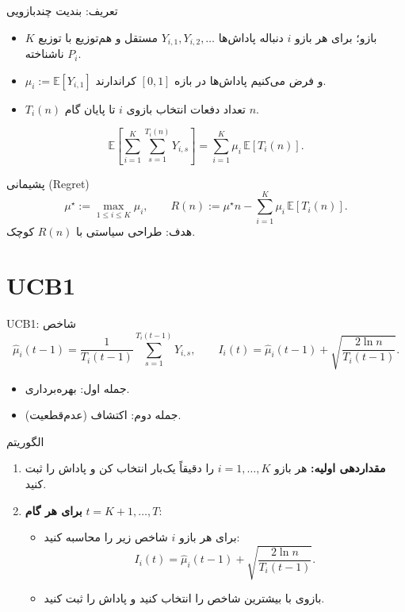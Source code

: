 \documentclass[aspectratio=169]{beamer}
\newcommand{\E}{\mathbb{E}}
\begin{document}
\begin{frame}{تعریف: بندیت چندبازویی}
\begin{itemize}
  \item $K$ بازو؛ برای هر بازو $i$ دنباله پاداش‌ها $Y_{i,1},Y_{i,2},\dots$ مستقل و هم‌توزیع با توزیع ناشناخته $P_i$.
  \item $\mu_i:=\E[Y_{i,1}]$ و فرض می‌کنیم پاداش‌ها در بازه $[0,1]$ کراندارند.
  \item $T_i(n)$ تعداد دفعات انتخاب بازوی $i$ تا پایان گام $n$.
\end{itemize}
\[
\E\!\left[\sum_{i=1}^K \sum_{s=1}^{T_i(n)} Y_{i,s}\right]
= \sum_{i=1}^K \mu_i \, \E[T_i(n)].
\]
\end{frame}

\begin{frame}{پشیمانی (Regret)}
\[
\mu^\star:=\max_{1\le i\le K}\mu_i,
\qquad
R(n):=\mu^\star n-\sum_{i=1}^K \mu_i\,\E[T_i(n)].
\]
هدف: طراحی سیاستی با $R(n)$ کوچک.
\end{frame}

\section{UCB1}

\begin{frame}{UCB1: شاخص}
\[
\widehat{\mu}_i(t-1)=\frac{1}{T_i(t-1)}\sum_{s=1}^{T_i(t-1)}Y_{i,s},
\qquad
I_i(t)=\widehat{\mu}_i(t-1)+\sqrt{\frac{2\ln n}{T_i(t-1)}}.
\]
\begin{itemize}
  \item جمله اول: بهره‌برداری.
  \item جمله دوم: اکتشاف (عدم‌قطعیت).
\end{itemize}
\end{frame}

\begin{frame}{الگوریتم }
\begin{tcolorbox}[colback=white, title=UCB1]
\begin{enumerate}
\item \textbf{مقداردهی اولیه:} هر بازو $i=1,\dots,K$ را دقیقاً یک‌بار انتخاب کن و پاداش را ثبت کنید.
\item \textbf{برای هر گام} $t=K+1,\dots,T$:
\begin{itemize}
  \item برای هر بازو $i$ شاخص زیر را محاسبه کنید:
  \[
  I_i(t)=\widehat{\mu}_i(t-1)+\sqrt{\frac{2\ln n}{T_i(t-1)}}.
  \]
  \item بازوی با بیشترین شاخص را انتخاب کنید و پاداش را ثبت کنید.
\end{itemize}
\end{enumerate}
\end{tcolorbox}
\end{frame}
\end{document}
